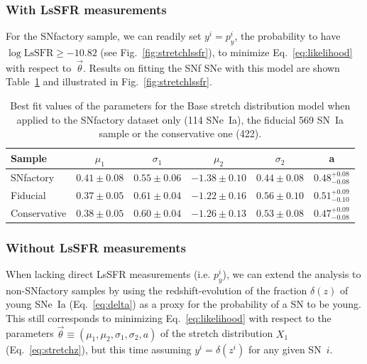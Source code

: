 \documentclass[]{aa} %
\begin{document}
\subsubsection{With LsSFR measurements}\label{sec:modelpy}

For the SNfactory sample, we can readily set $y^i = p_y^i$, the probability to
have $\log \mathrm{LsSFR} \geq -10.82$ (see Fig.~\ref{fig:stretchlssfr}), to
minimize Eq.~\ref{eq:likelihood} with respect to~$\vec{\theta}$. Results on
fitting the SNf SNe with this model are shown Table~\ref{tab:modelresults} and
illustrated in Fig.~\ref{fig:stretchlssfr}.

\begin{table}
    \centering
    \caption{Best fit values of the parameters for the Base stretch distribution
    model when applied to the SNfactory dataset only (114 SNe~Ia), the fiducial
569 SN~Ia sample or the conservative one (422).}
    \label{tab:modelresults}
    \begin{tabular}{lccccc}
    \hline\hline
        Sample & $\mu_1$  & $\sigma_1$
               & $\mu_2$ & $\sigma_2$
               & a \\
        \hline
        SNfactory & $0.41 \pm 0.08$ & $0.55 \pm 0.06$
                  & $-1.38 \pm 0.10$ & $0.44 \pm 0.08$
                  & $0.48^{+0.08}_{-0.08}$ \\
        Fiducial & $0.37 \pm 0.05$  & $0.61 \pm 0.04$
                 & $-1.22 \pm 0.16$ & $0.56 \pm 0.10$
                 & $0.51^{+0.09}_{-0.10}$ \\
        Conservative & $0.38 \pm 0.05$  & $0.60 \pm 0.04$
                     & $-1.26 \pm 0.13$ & $0.53 \pm 0.08$
                     & $0.47^{+0.09}_{-0.08}$ \\
        \hline
    \end{tabular}
\end{table}

\subsubsection{Without LsSFR measurements}\label{sec:modelnopy}

When lacking direct LsSFR measurements (i.e. $p_y^i$), we can extend the
analysis to non-SNfactory samples by using the redshift-evolution of the
fraction $\delta(z)$ of young SNe~Ia (Eq.~\ref{eq:delta}) as a proxy for the
probability of a SN to be young. This still corresponds to minimizing
Eq.~\ref{eq:likelihood} with respect to the parameters
$\vec{\theta}\equiv(\mu_1, \mu_2, \sigma_1, \sigma_2, a)$ of the stretch
distribution $X_1$ (Eq.~\ref{eq:stretchz}), but this time assuming $y^i =
\delta(z^i)$ for any given SN~$i$. 
\end{document}
